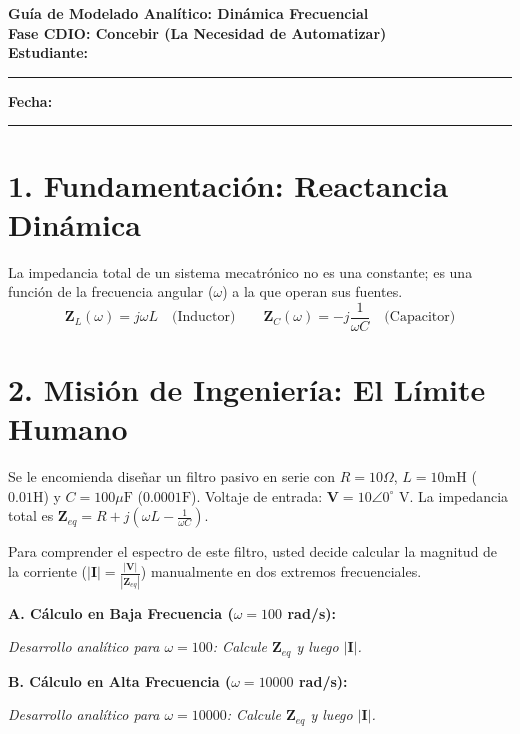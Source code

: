 \documentclass[11pt,a4paper]{article}
\begin{document}
\begin{center}
    {\Large \textbf{\textcolor{UCBblue}{Guía de Modelado Analítico: Dinámica Frecuencial}}}\\
    \vspace{0.3cm}
    {\large \textbf{Fase CDIO: Concebir (La Necesidad de Automatizar)}}\\
    \vspace{0.5cm}
    \textbf{Estudiante:} \rule{8cm}{0.4pt} \quad \textbf{Fecha:} \rule{3cm}{0.4pt}
\end{center}

\vspace{0.5cm}

\section*{1. Fundamentación: Reactancia Dinámica}
La impedancia total de un sistema mecatrónico no es una constante; es una función de la frecuencia angular ($\omega$) a la que operan sus fuentes. 
$$ \mathbf{Z}_L(\omega) = j\omega L \quad \text{(Inductor)} \quad \quad \mathbf{Z}_C(\omega) = -j\frac{1}{\omega C} \quad \text{(Capacitor)} $$

\section*{2. Misión de Ingeniería: El Límite Humano}
Se le encomienda diseñar un filtro pasivo en serie con $R = 10\Omega$, $L = 10\text{mH}$ ($0.01\text{H}$) y $C = 100\mu\text{F}$ ($0.0001\text{F}$). Voltaje de entrada: $\mathbf{V} = 10\angle0^\circ$ V. 
La impedancia total es $\mathbf{Z}_{eq} = R + j\left(\omega L - \frac{1}{\omega C}\right)$.

Para comprender el espectro de este filtro, usted decide calcular la magnitud de la corriente ($|\mathbf{I}| = \frac{|\mathbf{V}|}{|\mathbf{Z}_{eq}|}$) manualmente en dos extremos frecuenciales.

\vspace{0.3cm}
\textbf{A. Cálculo en Baja Frecuencia ($\omega = 100$ rad/s):}
\begin{tcolorbox}[colback=white,colframe=UCBgray,height=4cm,valign=top]
\textit{Desarrollo analítico para $\omega=100$: Calcule $\mathbf{Z}_{eq}$ y luego $|\mathbf{I}|$.}
\end{tcolorbox}

\textbf{B. Cálculo en Alta Frecuencia ($\omega = 10000$ rad/s):}
\begin{tcolorbox}[colback=white,colframe=UCBgray,height=4cm,valign=top]
\textit{Desarrollo analítico para $\omega=10000$: Calcule $\mathbf{Z}_{eq}$ y luego $|\mathbf{I}|$.}
\end{tcolorbox}
\end{document}
